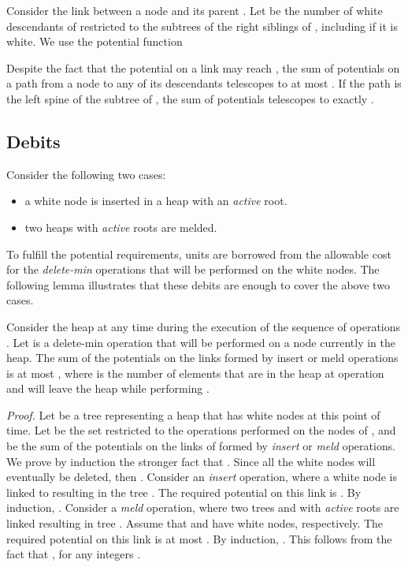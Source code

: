Consider the link between a node  and its parent .
Let  be the number of white descendants of  restricted to the subtrees of the right siblings of , including  if it is white. 
We use the potential function
 
 


Despite the fact that the potential on a link may reach , the sum of potentials on a path from a node  to any of its descendants telescopes to at most . If the path is the left spine of the subtree of , the sum of potentials telescopes to exactly  . 


\subsection{Debits}

Consider the following two cases:
\begin{itemize}
\item a white node is inserted in a heap with an {\it active} root. 
\item two heaps with {\it active} roots are melded. 
\end{itemize}

To fulfill the potential requirements,  units are borrowed from the allowable cost for the {\it delete-min} operations that will be performed on the white nodes. The following lemma illustrates that these debits are enough to cover the above two cases.

\begin{lemma}
\label{l1}
Consider the heap at any time during the execution of the sequence of operations . Let  is a delete-min operation that will be performed on a node currently in the heap.
The sum of the potentials on the links formed by insert or meld operations is at most , where  is the number of elements that are in the heap at operation  and will leave the heap while performing . 
\end{lemma}

{\it Proof.}
Let  be a tree representing a heap that has  white nodes at this point of time. Let  be the set  restricted to the operations performed on the nodes of , and  be the sum of the potentials on the links of  formed by {\it insert} or {\it meld} operations. We prove by induction the stronger fact that . Since all the white nodes will eventually be deleted, then .
Consider an {\it insert} operation, where a white node is linked to  resulting in the tree . The required potential on this link is . By induction, . 
Consider a {\it meld} operation, where two trees  and  with {\it active} roots are linked resulting in tree . Assume that  and  have  white nodes, respectively. The required potential on this link is at most . By induction, . This follows from the fact that , for any integers . 
\hfill 

